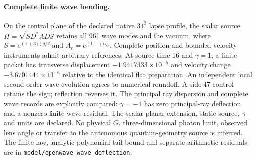 \paragraph{Complete finite wave bending.}
On the central plane of the declared native $31^3$ lapse profile, the
scalar source $H=\sqrt{SD^*ADS}$ retains all 961 wave modes and the vacuum,
where $S=e^{(1+3\gamma)q/2}$ and $A_e=e^{(1-\gamma)q_e}$.
Complete position and bounded velocity instruments admit arbitrary
references. At source time 16 and $\gamma=1$, a finite packet has
transverse displacement $-1.9417333\times10^{-5}$ and velocity change
$-3.6701444\times10^{-6}$ relative to the identical flat preparation.
An independent local second-order wave evolution agrees to numerical
roundoff. A side 47 control retains the sign; reflection reverses it.
The principal ray dispersion and complete wave records are explicitly
compared: $\gamma=-1$ has zero principal-ray deflection and a nonzero
finite-wave residual. The scalar planar extension, static source,
$\gamma$ and units are declared. No physical $G$, three-dimensional
photon limit, observed lens angle or transfer to the autonomous
quantum-geometry source is inferred. The finite law, analytic polynomial
tail bound and separate arithmetic residuals are in
\texttt{model/openwave\_wave\_deflection}.
